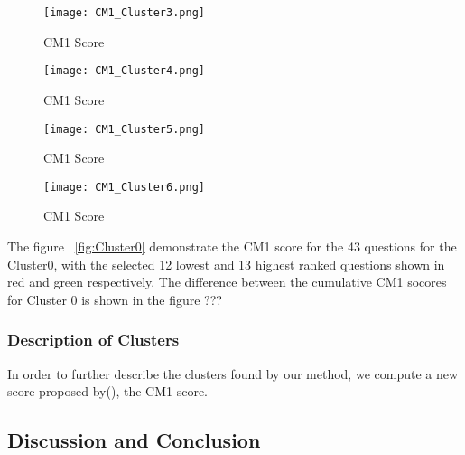 \documentclass{article}
\begin{document}
\begin{figure}[h]
	\texttt{[image: CM1\_Cluster3.png]}
	\caption{CM1 Score}
	\label{fig:Cluster3}
\end{figure}

\begin{figure}[h]
	\texttt{[image: CM1\_Cluster4.png]}
	\caption{CM1 Score}
	\label{fig:Cluster4}
\end{figure}

\begin{figure}[h]
	\texttt{[image: CM1\_Cluster5.png]}
	\caption{CM1 Score}
	\label{fig:Cluster5}
\end{figure}

\begin{figure}[h]
	\texttt{[image: CM1\_Cluster6.png]}
	\caption{CM1 Score}
	\label{fig:Cluster6}
\end{figure}

The figure ~\ref{fig:Cluster0} demonstrate the CM1 score for the 43
questions for the Cluster0, with the selected 12 lowest and 13 highest ranked
questions shown in red and green respectively. The difference between the
cumulative CM1 socores for Cluster 0 is shown in the figure ???


\subsubsection{Description of Clusters}

In order to further describe the clusters found by our method, we compute a new
score proposed by(), the CM1 score.





\subsection{Discussion and Conclusion}
\end{document}
